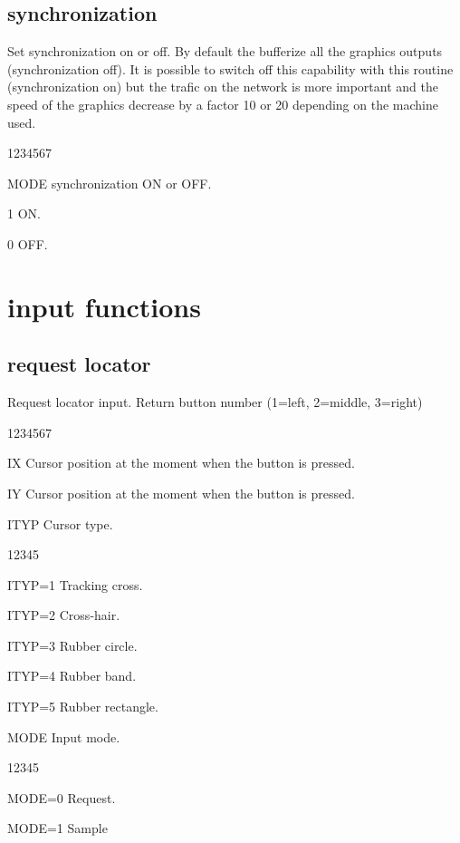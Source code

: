\subsection{ synchronization}
%
\Action
Set synchronization on or off. By default the \XW{} bufferize all the
graphics outputs (synchronization off). It is possible to switch off this
capability with this routine (synchronization on) but the trafic
on the network is more important and the speed of the graphics decrease
by a factor 10 or 20 depending on the machine used.
\Pdesc
\begin{DLtt}{1234567}
\item[MODE] synchronization ON or OFF.
\begin{DLtt}{12}
\item[1] ON.
\item[0] OFF.
\end{DLtt}
\end{DLtt}

\newpage%

\section{ input functions}
\subsection{ request locator}
%
\Action
Request locator input.
Return button number (1=left, 2=middle, 3=right)
\Pdesc
\begin{DLtt}{1234567}
\item[IX] Cursor position at the moment when the button is pressed.
\item[IY] Cursor position at the moment when the button is pressed.
\item[ITYP] Cursor type.
\begin{DLtt}{12345}
\item[ITYP=1] Tracking cross.
\item[ITYP=2] Cross-hair.
\item[ITYP=3] Rubber circle.
\item[ITYP=4] Rubber band.
\item[ITYP=5] Rubber rectangle.
\end{DLtt}
\item[MODE] Input mode.
\begin{DLtt}{12345}
\item[MODE=0] Request.
\item[MODE=1] Sample
\end{DLtt}
\end{DLtt}
